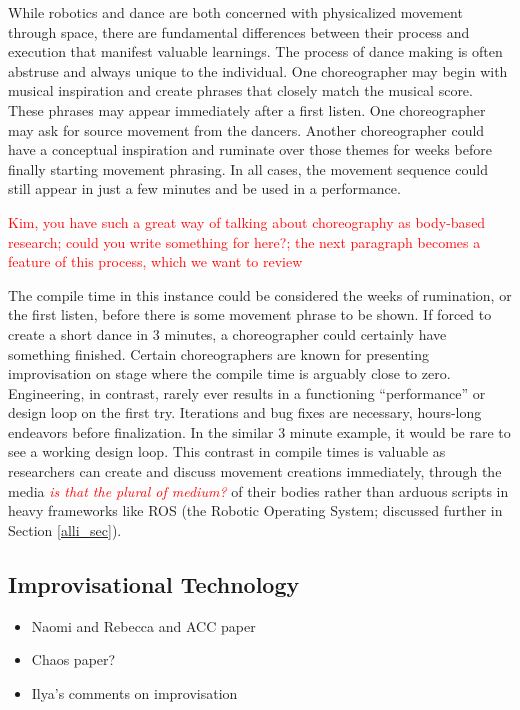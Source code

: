\documentclass[arts,article,submit,moreauthors,pdftex,10pt,a4paper]{mdpi}
\begin{document}
While robotics and dance are both concerned with physicalized movement through space, there are fundamental differences between their process and execution that manifest valuable learnings. The process of dance making is often abstruse and always unique to the individual.  One choreographer may begin with musical inspiration and create phrases that closely match the musical score.  These phrases may appear immediately after a first listen.  One choreographer may ask for source movement from the dancers.  Another choreographer could have a conceptual inspiration and ruminate over those themes for weeks before finally starting movement phrasing.  In all cases, the movement sequence could still appear in just a few minutes and be used in a performance.  

\textcolor{red}{Kim, you have such a great way of talking about choreography as body-based research; could you write something for here?; the next paragraph becomes a feature of this process, which we want to review}

The compile time in this instance could be considered the weeks of rumination, or the first listen, before there is some movement phrase to be shown.  If forced to create a short dance in 3 minutes, a choreographer could certainly have something finished.  Certain choreographers are known for presenting improvisation on stage where the compile time is arguably close to zero.  Engineering, in contrast, rarely ever results in a functioning ``performance'' or design loop on the first try.  Iterations and bug fixes are necessary, hours-long endeavors before finalization.  In the similar 3 minute example, it would be rare to see a working design loop.  This contrast in compile times is valuable as researchers can create and discuss movement creations immediately, through the media \textcolor{red}{\textit{is that the plural of medium?}} of their bodies rather than arduous scripts in heavy frameworks like ROS (the Robotic Operating System; discussed further in Section \ref{alli_sec}).

\subsection{Improvisational Technology}


\begin{itemize}
\item Naomi and Rebecca and ACC paper
\item Chaos paper?
\item Ilya's comments on improvisation
\end{itemize}
\end{document}
